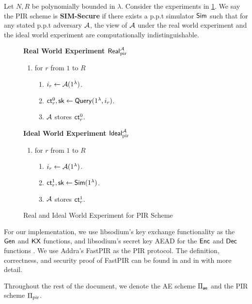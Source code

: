 \begin{definition}
\label{defn:PIR-SIM-security}
Let $N, R$ be polynomially bounded in $\lambda$. Consider the experiments in \cref{expr:pir-real-ideal-world}. We say the PIR scheme is \textbf{SIM-Secure} if there exists a p.p.t simulator $\mathsf{Sim}$ such that for any stated p.p.t adversary $\mathcal{A}$, the view of $\mathcal{A}$ under the real world experiment and the ideal world experiment are computationally indistinguishable. 

\begin{figure}[h!]
\begin{framed}
\textbf{Real World Experiment $\mathsf{Real}^{\mathcal{A}}_{\text{pir}}$}
\begin{enumerate}
    \item for $r$ from $1$ to $R$
    \begin{enumerate}
        \item $i_r \leftarrow \mathcal{A}(1^{\lambda})$.
        \item $\mathsf{ct}_r^0, {\mathsf{sk}} \leftarrow \mathsf{Query}(1^{\lambda}, i_r)$.
        \item $\mathcal{A}$ stores $\mathsf{ct}_r^0$.
    \end{enumerate}
\end{enumerate}
\textbf{Ideal World Experiment $\mathsf{Ideal}^{\mathcal{A}}_{\text{pir}}$}
\begin{enumerate}
    \item for $r$ from $1$ to $R$
    \begin{enumerate}
        \item $i_r \leftarrow \mathcal{A}(1^{\lambda})$.
        \item $\mathsf{ct}_r^1, {\mathsf{sk}} \leftarrow \mathsf{Sim}(1^{\lambda})$.
        \item $\mathcal{A}$ stores $\mathsf{ct}_r^1$.
    \end{enumerate}
\end{enumerate}
\end{framed}
\caption{Real and Ideal World Experiment for PIR Scheme}
\label{expr:pir-real-ideal-world}
\end{figure}
\end{definition}
For our implementation, we use libsodium's key exchange functionality as the $\mathsf{Gen}$ and $\mathsf{KX}$ functions, and libsodium's secret key AEAD for the $\mathsf{Enc}$ and $\mathsf{Dec}$ functions \cite{libsodium}. We use Addra's FastPIR as the PIR protocol. The definition, correctness, and security proof of FastPIR can be found in \cite[Section 4]{ahmad2021addra} and in \cite{angel2018thesis} with more detail.

Throughout the rest of the document, we denote the AE scheme $\Pi_{\mathsf{ae}}$ and the PIR scheme $\Pi_{\text{pir}}$.
